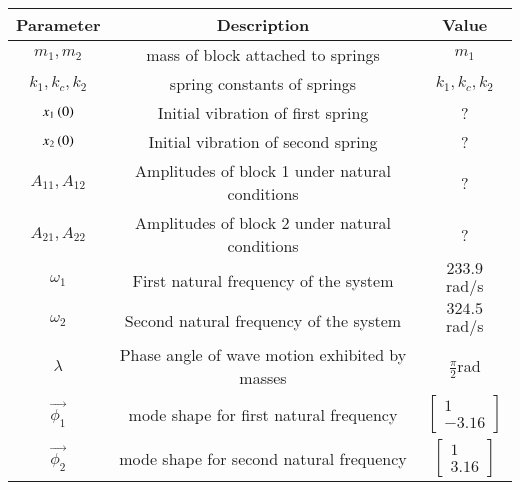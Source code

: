 \begin{tabular}{|c|c|c|}
    \hline
    \textbf{Parameter} & \textbf{Description} & \textbf{Value} \\
    \hline
    $m_1,m_2$ & mass of block attached to springs& $ m_1$\\
    \hline
    $k_1,k_c,k_2$ & spring constants of springs& $ k_1,k_c,k_2$\\
    \hline
    $x_1\left(0\right)$ & Initial vibration of first spring& ? \\
    \hline
    $x_2\left(0\right)$ & Initial vibration of second spring & ? \\
    \hline
    $A_{11},A_{12}$ & Amplitudes of block 1 under natural conditions& ?\\
    \hline
    $A_{21},A_{22}$ & Amplitudes of block 2 under natural conditions& ?\\
    \hline
    $\omega_1$ & First natural frequency of the system& $ 233.9$ rad/s\\
    \hline
    $\omega_2$ & Second natural frequency of the system &$ 324.5$ rad/s \\
    \hline
    $\lambda$ & Phase angle of wave motion exhibited by masses&$ \frac{\pi}{2} $rad\\
    \hline
    $\vec{\phi_1}$ & mode shape for first natural frequency& $ \begin{bmatrix}
1\\
-3.16
\end{bmatrix}$\\
    \hline
    $\vec{\phi_2}$ & mode shape for second natural frequency& $ \begin{bmatrix}
1\\
3.16
\end{bmatrix}$\\
    \hline
\end{tabular}





